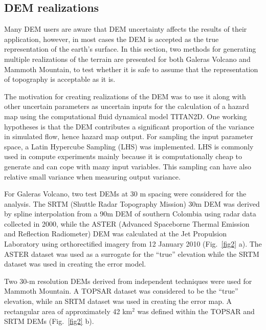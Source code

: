 \documentclass[12pt]{article}
\begin{document}

\subsection{DEM realizations}

Many DEM users are aware that DEM uncertainty affects the results of
their application, however, in most cases the DEM is accepted as the
true representation of the earth's surface. In this section, two
methods for generating multiple realizations of the terrain are
presented for both Galeras Volcano and Mammoth Mountain, to test
whether it is safe to assume that the representation of topography is
acceptable as it is.

The motivation for creating realizations of the DEM was to use
it along with other uncertain parameters as uncertain inputs
for the calculation of a hazard map using the computational fluid
dynamical model TITAN2D.  One working hypotheses is that the
DEM contributes a significant proportion of the variance in simulated
flow, hence hazard map output.  For sampling the input parameter
space, a Latin Hypercube Sampling (LHS) was implemented. LHS is
commonly used in compute experiments \citep{McKay1979, Sacks1989} mainly because
it is computationally cheap to generate and can cope with many input
variables. This sampling can have also relative small variance when
measuring output variance. %

For Galeras Volcano, two test DEMs at 30 m spacing were considered for
the analysis. The SRTM (Shuttle Radar Topography Mission) 30m DEM was
derived by spline interpolation from a 90m DEM of southern Colombia
using radar data collected in 2000, while the ASTER (Advanced
Spaceborne Thermal Emission and Reflection Radiometer) DEM was
calculated at the Jet Propulsion Laboratory using orthorectified
imagery from 12 January 2010 (Fig.~\ref{fig2} a).  The ASTER dataset
was used as a surrogate for the ``true'' elevation while the SRTM
dataset was used in creating the error model.


Two 30-m resolution DEMs derived from independent techniques were used
for Mammoth Mountain.  A TOPSAR dataset was considered to be the
``true'' elevation, while an SRTM dataset was used in creating the
error map.  A rectangular area of approximately 42 km$^2$ was
defined within the TOPSAR and SRTM DEMs (Fig.~\ref{fig2} b).
\end{document}
